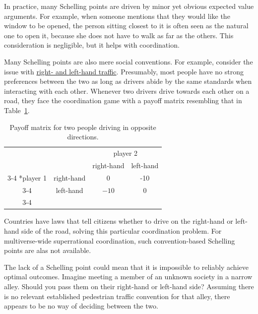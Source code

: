 In practice, many Schelling points are driven by minor yet obvious
expected value arguments. For example, when someone mentions that they
would like the window to be opened, the person sitting closest to it is
often seen as the natural one to open it, because she does not have to
walk as far as the others. This consideration is negligible, but it
helps with coordination.

Many Schelling points are also mere social conventions. For example,
consider the issue with
\href{https://en.wikipedia.org/wiki/Right-_and_left-hand_traffic}{right-
and left-hand traffic}. Presumably, most people have no strong
preferences between the two as long as drivers abide by the same
standards when interacting with each other. Whenever two drivers drive
towards each other on a road, they face the coordination game with a
payoff matrix resembling that in Table~\ref{right-or-left-hand-traffic}.

\renewcommand{\arraystretch}{1.5}
\begin{table}[h!]
    \centering
    \setlength{\extrarowheight}{2pt}
    \begin{tabular}{cc|c|c|}
      & \multicolumn{1}{c}{} & \multicolumn{2}{c}{player 2}\\
      & \multicolumn{1}{c}{} & \multicolumn{1}{c}{right-hand}  & \multicolumn{1}{c}{left-hand} \\\cline{3-4}
      \multirow{2}*{player 1}  & right-hand & $0$ &-10 \\\cline{3-4}
      & left-hand & $-10$ & $0$ \\\cline{3-4}
    \end{tabular}
    \caption{Payoff matrix for two people driving in opposite directions.}
    \label{right-or-left-hand-traffic}
\end{table}

Countries have laws that tell citizens whether to drive on the
right-hand or left-hand side of the road, solving this particular
coordination problem. For multiverse-wide superrational coordination,
such convention-based Schelling points are alas not available.

The lack of a Schelling point could mean that it is impossible to
reliably achieve optimal outcomes. Imagine meeting a member of an
unknown society in a narrow alley. Should you pass them on their
right-hand or left-hand side? Assuming there is no relevant established
pedestrian traffic convention for that alley, there appears to be no way
of deciding between the two.


